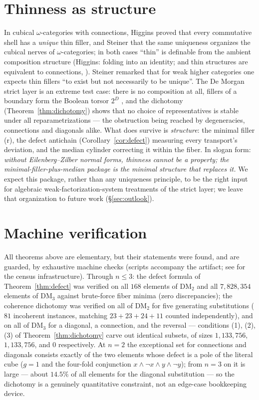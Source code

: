 \documentclass[11pt]{amsart}
\theoremstyle{definition}
\newcommand{\DM}{\mathrm{DM}}
\newcommand{\rmin}{\mathrm{r}}
\begin{document}
\section{Thinness as structure}
\label{sec:thin}

In cubical $\omega$-categories with connections, Higgins
\cite{Higgins} proved that every commutative shell has a
\emph{unique} thin filler, and Steiner \cite{Steiner} that the same
uniqueness organizes the cubical nerves of $\omega$-categories;
in both cases ``thin'' is definable from the ambient composition
structure (Higgins: folding into an identity; and thin structures
are equivalent to connections, \cite[Thm.~3.1]{Higgins}).  Steiner
remarked that for weak higher categories one expects thin fillers
``to exist but not necessarily to be unique''.  The De Morgan
strict layer is an extreme test case: there is no composition at
all, fillers of a boundary form the Boolean torsor $2^{D}$
\cite{DMFibers}, and the dichotomy
(Theorem~\ref{thm:dichotomy}) shows that no choice of
representatives is stable under all reparametrizations --- the
obstruction being reached by degeneracies, connections and
diagonals alike.  What does survive is \emph{structure}: the
minimal filler ($\rmin$), the defect antichain
(Corollary~\ref{cor:defect}) measuring every transport's deviation,
and the median cylinder correcting it within the fiber.  In slogan
form: \emph{without Eilenberg--Zilber normal forms, thinness cannot
be a property; the minimal-filler-plus-median package is the minimal
structure that replaces it.}  We expect this package, rather than
any uniqueness principle, to be the right input for algebraic
weak-factorization-system treatments of the strict layer; we leave
that organization to future work
(\S\ref{sec:outlook}).

\section{Machine verification}
\label{sec:machine}

All theorems above are elementary, but their statements were found,
and are guarded, by exhaustive machine checks (scripts accompany the
artifact; see \cite{DMFibers} for the census infrastructure).
Through $n \leq 3$:
the defect formula of Theorem~\ref{thm:defect} was verified on all
$168$ elements of $\DM_2$ and all $7{,}828{,}354$ elements of
$\DM_3$ against brute-force fiber minima (zero discrepancies); the
coherence dichotomy was verified on all of $\DM_2$ for five
generating substitutions ($81$ incoherent instances, matching
$23 + 23 + 24 + 11$ counted independently), and on all of $\DM_3$
for a diagonal, a connection, and the reversal --- conditions
(1), (2), (3) of Theorem~\ref{thm:dichotomy} carve out identical
subsets, of sizes $1{,}133{,}756$, $1{,}133{,}756$, and $0$
respectively.  At $n = 2$ the exceptional set for connections and
diagonals consists exactly of the two elements whose defect is a
pole of the literal cube ($g = 1$ and the four-fold conjunction
$x \wedge \neg x \wedge y \wedge \neg y$); from $n = 3$ on it is
large --- about $14.5\%$ of all elements for the diagonal
substitution --- so the dichotomy is a genuinely quantitative
constraint, not an edge-case bookkeeping device.
\end{document}
